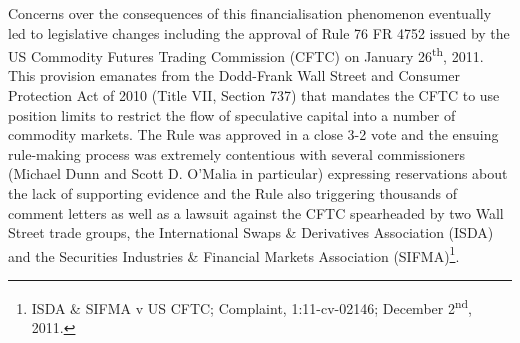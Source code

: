 \documentclass[]{elsarticle} %
\begin{document}
Concerns over the consequences of this financialisation phenomenon eventually led to legislative changes including the approval of Rule 76 FR 4752 issued by the US Commodity Futures Trading Commission (CFTC) on January 26\textsuperscript{th}, 2011. This provision emanates from the Dodd-Frank Wall Street and Consumer Protection Act of 2010 (Title VII, Section 737) that mandates the CFTC to use position limits to restrict the flow of speculative capital into a number of commodity markets. The Rule was approved in a close 3-2 vote and the ensuing rule-making process was extremely contentious with several commissioners (Michael Dunn and Scott D. O'Malia in particular) expressing reservations about the lack of supporting evidence and the Rule also triggering thousands of comment letters as well as a lawsuit against the CFTC spearheaded by two Wall Street trade groups, the International Swaps \& Derivatives Association (ISDA) and the Securities Industries \& Financial Markets Association (SIFMA)\footnote{ISDA \& SIFMA v US CFTC; Complaint, 1:11-cv-02146; December 2\textsuperscript{nd}, 2011.}.

\medskip\setlength{\parindent}{0pt}
\end{document}
